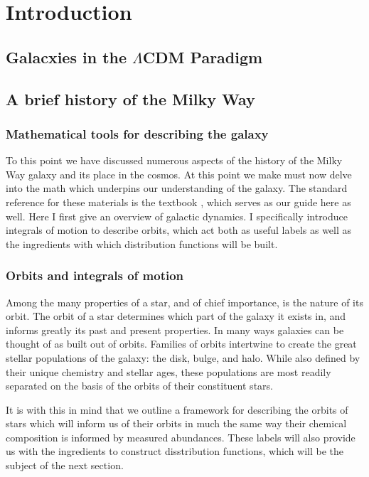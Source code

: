 \chapter{Introduction}


\section{Galacxies in the $\Lambda$CDM Paradigm}

\section{A brief history of the Milky Way}

\subsection{Mathematical tools for describing the galaxy}

To this point we have discussed numerous aspects of the history of the Milky Way galaxy and its place in the cosmos. At this point we make must now delve into the math which underpins our understanding of the galaxy. The standard reference for these materials is the textbook \cite{binney08}, which serves as our guide here as well. Here I first give an overview of galactic dynamics. I specifically introduce integrals of motion to describe orbits, which act both as useful labels as well as the ingredients with which distribution functions will be built.

\subsection{Orbits and integrals of motion}

Among the many properties of a star, and of chief importance, is the nature of its orbit. The orbit of a star determines which part of the galaxy it exists in, and informs greatly its past and present properties. In many ways galaxies can be thought of as built out of orbits. Families of orbits intertwine to create the great stellar populations of the galaxy: the disk, bulge, and halo. While also defined by their unique chemistry and stellar ages, these populations are most readily separated on the basis of the orbits of their constituent stars.

It is with this in mind that we outline a framework for describing the orbits of stars which will inform us of their orbits in much the same way their chemical composition is informed by measured abundances. These labels will also provide us with the ingredients to construct disstribution functions, which will be the subject of the next section.

